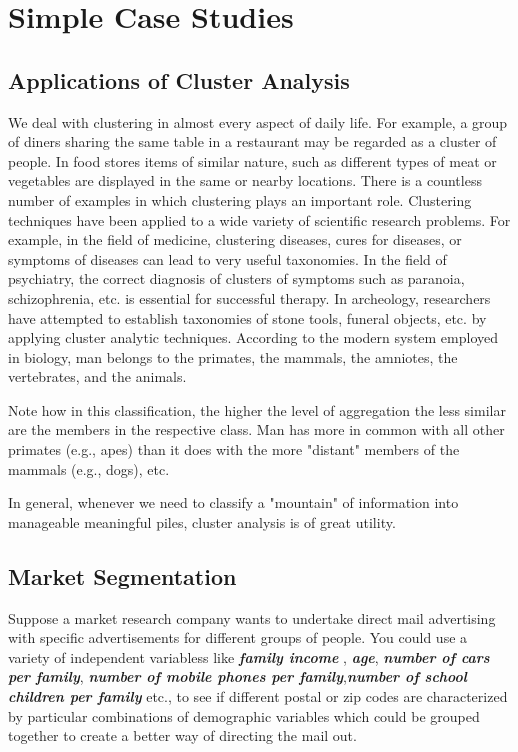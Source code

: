 \documentclass[a4paper,12pt]{report}
\begin{document}
	
	
	
	
	\tableofcontents
	\section{Simple Case Studies}
\subsection{Applications of Cluster Analysis}

We deal with clustering in almost every aspect of daily life. For example, a group of diners sharing the same table in a restaurant may be regarded as a cluster of people. In food stores items of similar nature, such as different types of meat or vegetables are displayed in the same or nearby locations. There is a countless number of examples in which clustering plays an important role. Clustering techniques have been applied to a wide variety of scientific research problems. For example, in the field of medicine, clustering diseases, cures for diseases, or symptoms of diseases can lead to very useful taxonomies. In the field of psychiatry, the correct diagnosis of clusters of symptoms such as paranoia, schizophrenia, etc. is essential for successful therapy. In archeology, researchers have attempted to establish taxonomies of stone tools, funeral objects, etc. by applying cluster analytic techniques. According to the modern system employed in biology, man belongs to the primates, the mammals, the amniotes, the vertebrates, and the animals.

Note how in this classification, the higher the level of aggregation the less similar are the members in the respective class. Man has more in common with all other primates (e.g., apes) than it does with the more "distant" members of the mammals (e.g., dogs), etc.

In general, whenever we need to classify a "mountain" of information into manageable meaningful piles, cluster analysis is of great utility.


\subsection{Market Segmentation}
Suppose a market research company wants to undertake direct mail advertising with specific advertisements
for different groups of people. You could use a variety of independent variabless like \textbf{\textit{family income}}
, \textbf{\textit{age}}, \textbf{\textit{number of cars per family}}, \textbf{\textit{number of mobile phones per family}},\textbf{\textit{number of school children per family}}  etc., to see if different postal or zip codes are characterized by particular combinations of demographic variables which could be grouped together to create a better way of directing the mail out.
\end{document}
